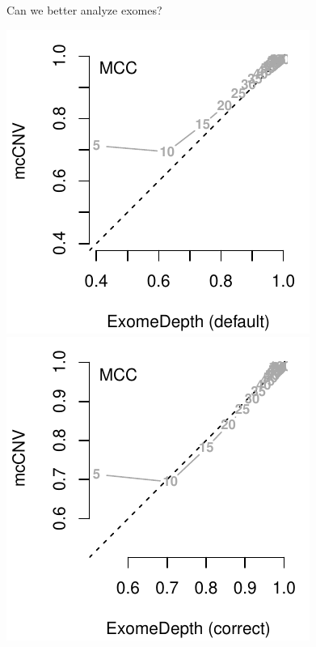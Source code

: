 \documentclass[
  10pt,
  ignorenonframetext,
  m]{beamer}
\begin{document}
\begin{frame}{Can we better analyze exomes?}
\protect\hypertarget{can-we-better-analyze-exomes-1}{}

\begin{center}\includegraphics[width=0.49\linewidth]{defense_files/figure-beamer/simResMCC-1} \includegraphics[width=0.49\linewidth]{defense_files/figure-beamer/simResMCC-2} \end{center}

\end{frame}
\end{document}
